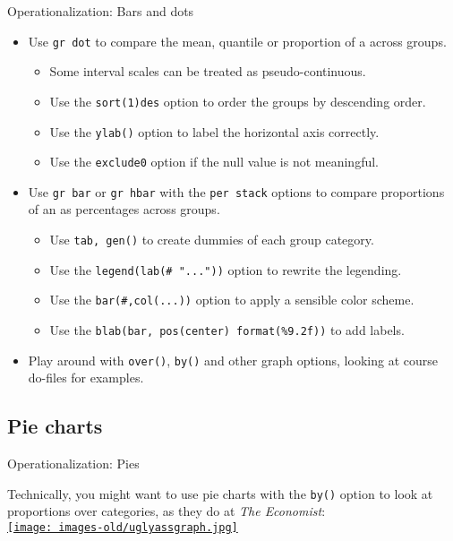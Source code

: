 \documentclass[t]{beamer}
\begin{document}
	\begin{frame}[t]{Operationalization: Bars and dots}

	\begin{itemize}
		\item Use \texttt{gr dot} to compare the mean, quantile or proportion of a  across groups.
		
		\begin{itemize}
			\item Some interval scales can be treated as pseudo-continuous.
			\item Use the \texttt{sort(1)des} option to order the groups by descending order.
			\item Use the \texttt{ylab()} option to label the horizontal axis correctly.
			\item Use the \texttt{exclude0} option if the null value is not meaningful.
		\end{itemize}
		
		\item Use \texttt{gr bar} or \texttt{gr hbar} with the \texttt{per stack} options to compare proportions of an  as percentages across groups.
		
		\begin{itemize}
			\item Use \texttt{tab, gen()} to create dummies of each group category.
			\item Use the \texttt{legend(lab(\# "..."))} option to rewrite the legending.
			\item Use the \texttt{bar(\#,col(...))} option to apply a sensible color scheme.
			\item Use the \texttt{blab(bar, pos(center) format(\%9.2f))} to add labels.
		\end{itemize}
		
		\item Play around with \texttt{over()}, \texttt{by()} and other graph options, looking at course do-files for examples.
	\end{itemize}

	\end{frame}
	
	\subsection{Pie charts}

	\begin{frame}[t]{Operationalization: Pies}

		Technically, you might want to use pie charts with the \texttt{by()} option to look at proportions over categories, as they  do at \textit{The Economist}:\\[1em]

		\href{http://andrewgelman.com/2011/04/attractive_but/}{\texttt{[image: images-old/uglyassgraph.jpg]}}

	\end{frame}
		
\end{document}
